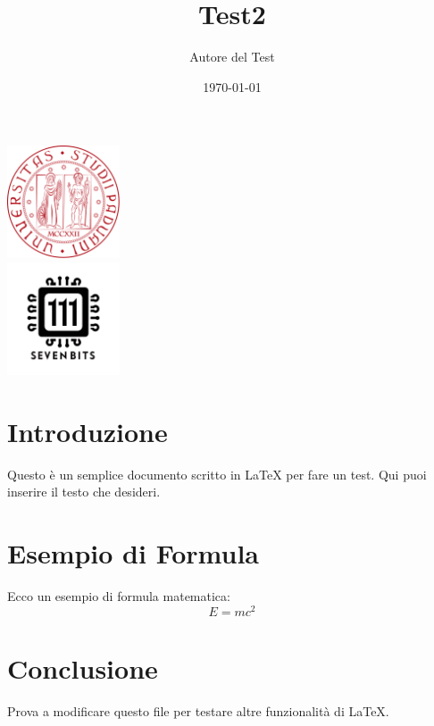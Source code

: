 \documentclass[a4paper,12pt]{article}
\title{Test2}
\author{Autore del Test}
\date{\today} %
\begin{document}
\maketitle

\center 
\includegraphics[width=0.25\textwidth]{LogoUnipd}\\
\includegraphics[width=0.25\textwidth]{Sevenbitslogo}\\

\section{Introduzione}
Questo è un semplice documento scritto in \LaTeX{} per fare un test. Qui puoi inserire il testo che desideri.

\section{Esempio di Formula}
Ecco un esempio di formula matematica:
\[
E = mc^2
\]

\section{Conclusione}
Prova a modificare questo file per testare altre funzionalità di \LaTeX.
\end{document}
